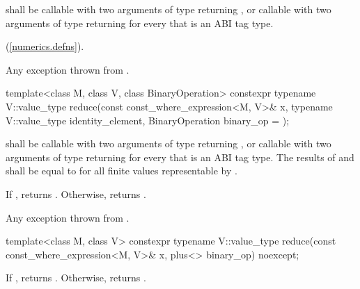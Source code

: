 \begin{itemdescr}
  \pnum\requires
   shall be callable with two arguments of type  returning , or callable with two arguments of type  returning  for every  that is an ABI tag type.

  \pnum\returns
   \foralli (\ref{numerics.defns}).

  \pnum\throws
  Any exception thrown from .

\end{itemdescr}

\begin{itemdecl}
template<class M, class V, class BinaryOperation>
  constexpr typename V::value_type reduce(const const_where_expression<M, V>& x,
                                typename V::value_type identity_element,
                                BinaryOperation binary_op = {});
\end{itemdecl}

\begin{itemdescr}
  \pnum\requires
   shall be callable with two arguments of type  returning , or callable with two arguments of type  returning  for every  that is an ABI tag type. The results of  and  shall be equal to  for all finite values  representable by .

  \pnum\returns
  If , returns . Otherwise, returns  \forallmaskedi.

  \pnum\throws
  Any exception thrown from .
\end{itemdescr}

\begin{itemdecl}
template<class M, class V>
  constexpr typename V::value_type reduce(const const_where_expression<M, V>& x, plus<> binary_op) noexcept;
\end{itemdecl}

\begin{itemdescr}
  \pnum\returns
  If , returns . Otherwise, returns  \forallmaskedi.
\end{itemdescr}

